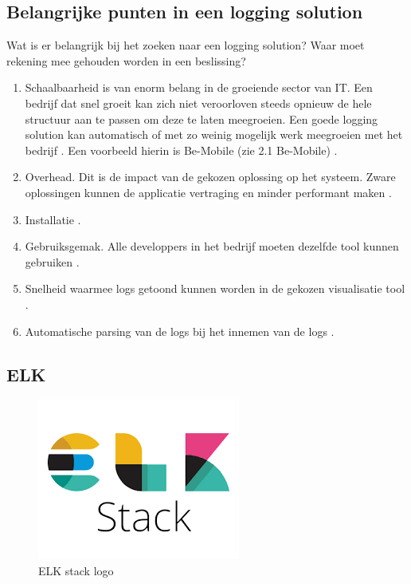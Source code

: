 \subsection{Belangrijke punten in een logging solution}

Wat is er belangrijk bij het zoeken naar een logging solution? Waar moet rekening mee gehouden worden in een beslissing?

\begin{enumerate}
    \item  Schaalbaarheid is van enorm belang in de groeiende sector van IT. Een bedrijf dat snel groeit kan zich niet veroorloven steeds opnieuw de hele structuur aan te passen om deze te laten meegroeien. Een goede logging solution kan automatisch of met zo weinig mogelijk werk meegroeien met het bedrijf \autocite{logdna2018}. Een voorbeeld hierin is Be-Mobile (zie 2.1 Be-Mobile) \autocite{jens2019}. 
    \item Overhead. Dit is de impact van de gekozen oplossing op het systeem. Zware oplossingen kunnen de applicatie vertraging en minder performant maken \autocite{gifford2015}.
    \item Installatie \autocite{logdna2018}.
    \item Gebruiksgemak. Alle developpers in het bedrijf moeten dezelfde tool kunnen gebruiken \autocite{logdna2018}.
    \item Snelheid waarmee logs getoond kunnen worden in de gekozen visualisatie tool \autocite{logdna2018}.
    \item Automatische parsing van de logs bij het innemen van de logs \autocite{logdna2018}.
\end{enumerate}

\subsection{ELK}

\begin{figure}[ht]
    \centering
    \includegraphics[scale=0.7]{img/ELK-logo}
    \caption[ELK stack logo]{ELK stack logo \cite{berman2018-12}}
\end{figure}

